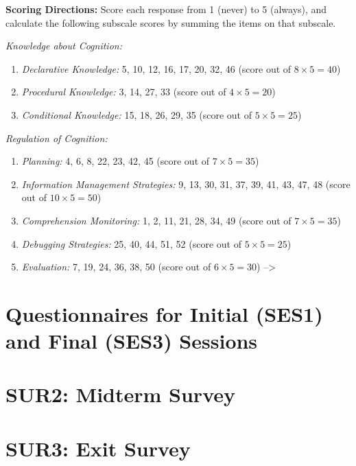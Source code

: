 \documentclass[letterpaper, nobind]{templates/ociamthesis}
\providecommand{\tightlist}{%
  \setlength{\itemsep}{0pt}\setlength{\parskip}{0pt}}
\begin{document}
\textbf{Scoring Directions:} Score each response from 1 (never) to 5
(always), and calculate the following subscale scores by summing the
items on that subscale.

\emph{Knowledge about Cognition:}

\begin{enumerate}
\def\labelenumi{\arabic{enumi}.}
\tightlist
\item
  \emph{Declarative Knowledge:} 5, 10, 12, 16, 17, 20, 32, 46 (score out of \(8\times5 = 40\))
\item
  \emph{Procedural Knowledge:} 3, 14, 27, 33 (score out of \(4\times5 = 20\))
\item
  \emph{Conditional Knowledge:} 15, 18, 26, 29, 35 (score out of \(5\times5 = 25\))
\end{enumerate}

\emph{Regulation of Cognition:}

\begin{enumerate}
\def\labelenumi{\arabic{enumi}.}
\tightlist
\item
  \emph{Planning:} 4, 6, 8, 22, 23, 42, 45 (score out of \(7\times5 = 35\))
\item
  \emph{Information Management Strategies:} 9, 13, 30, 31, 37, 39, 41, 43, 47, 48 (score out of \(10\times5 = 50\))
\item
  \emph{Comprehension Monitoring:} 1, 2, 11, 21, 28, 34, 49 (score out of \(7\times5 = 35\))
\item
  \emph{Debugging Strategies:} 25, 40, 44, 51, 52 (score out of \(5\times5 = 25\))
\item
  \emph{Evaluation:} 7, 19, 24, 36, 38, 50 (score out of \(6\times5 = 30\))
  --\textgreater{}
\end{enumerate}

\hypertarget{app_pre_post_tasks}{%
\chapter{Questionnaires for Initial (SES1) and Final (SES3) Sessions}\label{app_pre_post_tasks}}

\hypertarget{app_midterm_survey}{%
\chapter{SUR2: Midterm Survey}\label{app_midterm_survey}}

\hypertarget{app_final_survey}{%
\chapter{SUR3: Exit Survey}\label{app_final_survey}}
\end{document}
